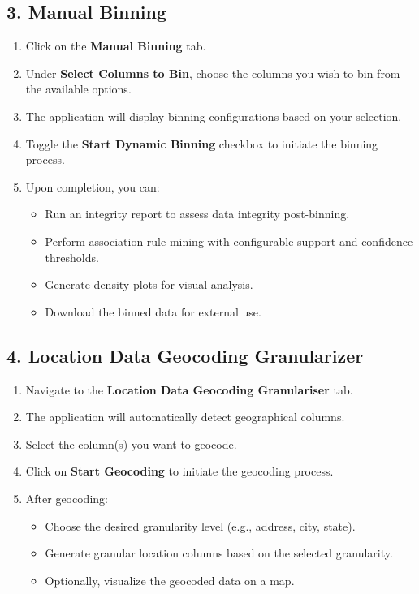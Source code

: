 \documentclass[12pt,a4paper]{article}
\begin{document}
\subsection{3. Manual Binning}
\label{sec:manual_binning}
\begin{enumerate}
    \item Click on the \textbf{Manual Binning} tab.
    \item Under \textbf{Select Columns to Bin}, choose the columns you wish to bin from the available options.
    \item The application will display binning configurations based on your selection.
    \item Toggle the \textbf{Start Dynamic Binning} checkbox to initiate the binning process.
    \item Upon completion, you can:
    \begin{itemize}
        \item Run an integrity report to assess data integrity post-binning.
        \item Perform association rule mining with configurable support and confidence thresholds.
        \item Generate density plots for visual analysis.
        \item Download the binned data for external use.
    \end{itemize}
\end{enumerate}

\subsection{4. Location Data Geocoding Granularizer}
\label{sec:location_granularizer}
\begin{enumerate}
    \item Navigate to the \textbf{Location Data Geocoding Granulariser} tab.
    \item The application will automatically detect geographical columns.
    \item Select the column(s) you want to geocode.
    \item Click on \textbf{Start Geocoding} to initiate the geocoding process.
    \item After geocoding:
    \begin{itemize}
        \item Choose the desired granularity level (e.g., address, city, state).
        \item Generate granular location columns based on the selected granularity.
        \item Optionally, visualize the geocoded data on a map.
    \end{itemize}
\end{enumerate}
\end{document}
